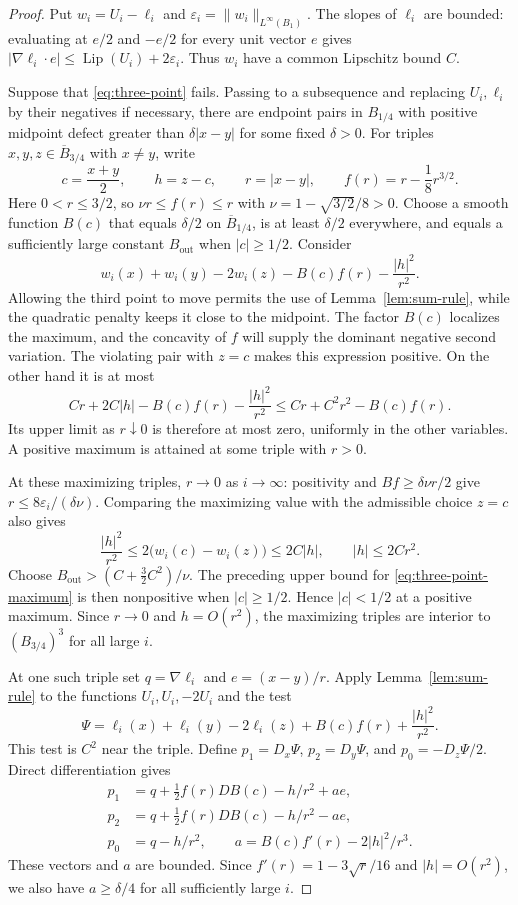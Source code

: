 \documentclass[11pt]{article}
\numberwithin{equation}{section}
\theoremstyle{definition}
\theoremstyle{remark}
\DeclareMathOperator{\Lip}{Lip}
\begin{document}
\begin{proof}
Put $w_i=U_i-\ell_i$ and $\varepsilon_i=\|w_i\|_{L^\infty(B_1)}$. The slopes of $\ell_i$ are bounded: evaluating at $e/2$ and $-e/2$ for every unit vector $e$ gives $|\nabla\ell_i\cdot e|\le\Lip(U_i)+2\varepsilon_i$. Thus $w_i$ have a common Lipschitz bound $C$.

Suppose that \eqref{eq:three-point} fails. Passing to a subsequence and replacing $U_i,\ell_i$ by their negatives if necessary, there are endpoint pairs in $B_{1/4}$ with positive midpoint defect greater than $\delta|x-y|$ for some fixed $\delta>0$. For triples $x,y,z\in\overline B_{3/4}$ with $x\ne y$, write
\[
  c=\frac{x+y}{2},\qquad h=z-c,\qquad r=|x-y|,
  \qquad f(r)=r-\frac18r^{3/2}.
\]
Here $0<r\le3/2$, so $\nu r\le f(r)\le r$ with $\nu=1-\sqrt{3/2}/8>0$. Choose a smooth function $B(c)$ that equals $\delta/2$ on $\overline B_{1/4}$, is at least $\delta/2$ everywhere, and equals a sufficiently large constant $B_{\mathrm{out}}$ when $|c|\ge1/2$. Consider
\begin{equation}\label{eq:three-point-maximum}
  w_i(x)+w_i(y)-2w_i(z)-B(c)f(r)-\frac{|h|^2}{r^2}.
\end{equation}
Allowing the third point to move permits the use of Lemma~\ref{lem:sum-rule}, while the quadratic penalty keeps it close to the midpoint. The factor $B(c)$ localizes the maximum, and the concavity of $f$ will supply the dominant negative second variation.
The violating pair with $z=c$ makes this expression positive. On the other hand it is at most
\[
  Cr+2C|h|-B(c)f(r)-\frac{|h|^2}{r^2}
  \le Cr+C^2r^2-B(c)f(r).
\]
Its upper limit as $r\downarrow0$ is therefore at most zero, uniformly in the other variables. A positive maximum is attained at some triple with $r>0$.

At these maximizing triples, $r\to0$ as $i\to\infty$: positivity and $Bf\ge\delta\nu r/2$ give $r\le8\varepsilon_i/(\delta\nu)$. Comparing the maximizing value with the admissible choice $z=c$ also gives
\[
  \frac{|h|^2}{r^2}\le2\bigl(w_i(c)-w_i(z)\bigr)\le2C|h|,
  \qquad |h|\le2Cr^2.
\]
Choose $B_{\mathrm{out}}>(C+\tfrac32C^2)/\nu$. The preceding upper bound for \eqref{eq:three-point-maximum} is then nonpositive when $|c|\ge1/2$. Hence $|c|<1/2$ at a positive maximum. Since $r\to0$ and $h=O(r^2)$, the maximizing triples are interior to $(B_{3/4})^3$ for all large $i$.

At one such triple set $q=\nabla\ell_i$ and $e=(x-y)/r$. Apply Lemma~\ref{lem:sum-rule} to the functions $U_i,U_i,-2U_i$ and the test
\[
  \Psi=\ell_i(x)+\ell_i(y)-2\ell_i(z)+B(c)f(r)+\frac{|h|^2}{r^2}.
\]
This test is $C^2$ near the triple. Define $p_1=D_x\Psi$, $p_2=D_y\Psi$, and $p_0=-D_z\Psi/2$. Direct differentiation gives
\begin{align*}
  p_1&=q+\tfrac12f(r)DB(c)-h/r^2+a e,\\
  p_2&=q+\tfrac12f(r)DB(c)-h/r^2-a e,\\
  p_0&=q-h/r^2,\qquad
  a=B(c)f'(r)-2|h|^2/r^3.
\end{align*}
These vectors and $a$ are bounded. Since $f'(r)=1-3\sqrt r/16$ and $|h|=O(r^2)$, we also have $a\ge\delta/4$ for all sufficiently large $i$.


\end{proof}
\end{document}
